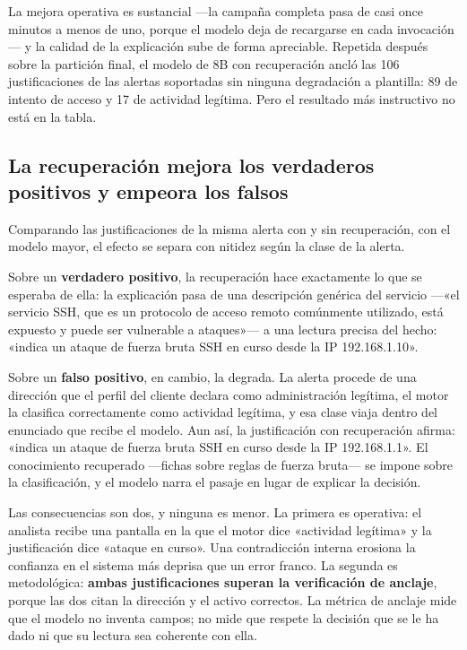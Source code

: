 La mejora operativa es sustancial ---la campaña completa pasa de casi once minutos a menos de uno,
porque el modelo deja de recargarse en cada invocación--- y la calidad de la explicación sube de
forma apreciable. Repetida después sobre la partición final, el modelo de 8B con recuperación ancló
las 106 justificaciones de las alertas soportadas sin ninguna degradación a plantilla: 89 de intento
de acceso y 17 de actividad legítima. Pero el resultado más instructivo no está en la tabla.

\subsection{La recuperación mejora los verdaderos positivos y empeora los falsos}

Comparando las justificaciones de la misma alerta con y sin recuperación, con el modelo mayor, el
efecto se separa con nitidez según la clase de la alerta.

Sobre un \textbf{verdadero positivo}, la recuperación hace exactamente lo que se esperaba de ella:
la explicación pasa de una descripción genérica del servicio ---«el servicio SSH, que es un
protocolo de acceso remoto comúnmente utilizado, está expuesto y puede ser vulnerable a
ataques»--- a una lectura precisa del hecho: «indica un ataque de fuerza bruta SSH en curso desde
la IP 192.168.1.10».

Sobre un \textbf{falso positivo}, en cambio, la degrada. La alerta procede de una dirección que el
perfil del cliente declara como administración legítima, el motor la clasifica correctamente como
actividad legítima, y esa clase viaja dentro del enunciado que recibe el modelo. Aun así, la
justificación con recuperación afirma: «indica un ataque de fuerza bruta SSH en curso desde la IP
192.168.1.1». El conocimiento recuperado ---fichas sobre reglas de fuerza bruta--- se impone sobre
la clasificación, y el modelo narra el pasaje en lugar de explicar la decisión.

Las consecuencias son dos, y ninguna es menor. La primera es operativa: el analista recibe una
pantalla en la que el motor dice «actividad legítima» y la justificación dice «ataque en curso».
Una contradicción interna erosiona la confianza en el sistema más deprisa que un error franco. La
segunda es metodológica: \textbf{ambas justificaciones superan la verificación de anclaje}, porque
las dos citan la dirección y el activo correctos. La métrica de anclaje mide que el modelo no
inventa campos; no mide que respete la decisión que se le ha dado ni que su lectura sea coherente
con ella.

